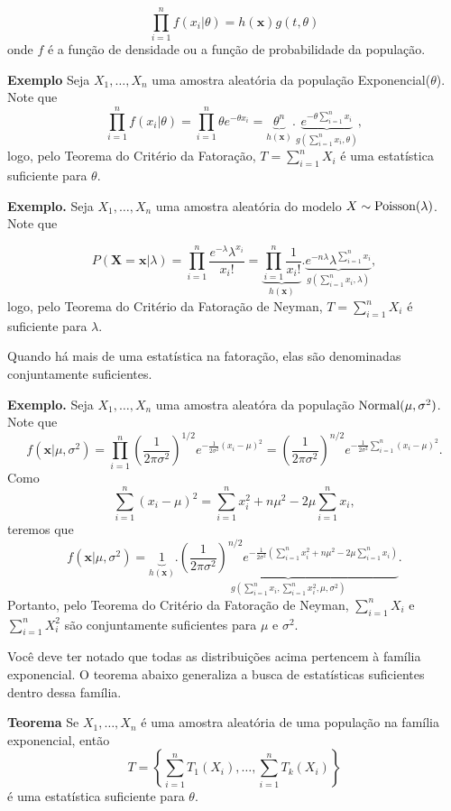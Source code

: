 \documentclass[
  letterpaper,
  DIV=11,
  numbers=noendperiod]{scrreprt}
\begin{document}
\[\prod_{i=1}^nf(x_i|\theta)=h(\textbf{x})g(t,\theta)\] onde \(f\) é a
função de densidade ou a função de probabilidade da população.

\textbf{Exemplo} Seja \(X_1,\ldots,X_n\) uma amostra aleatória da
população Exponencial(\(\theta\)). Note que
\[\prod_{i=1}^n  f(x_i|\theta)=\prod_{i=1}^n \theta e^{-\theta x_i}=\underbrace{\theta^n}_{h(\textbf{x})}. \underbrace{e^{-\theta\sum_{i=1}^n x_i}}_{g(\sum_{i=1}^n x_i,\theta)},\]
logo, pelo Teorema do Critério da Fatoração, \(T=\sum_{i=1}^{n}X_i\) é
uma estatística suficiente para \(\theta\).

\textbf{Exemplo.} Seja \(X_1,\ldots,X_n\) uma amostra aleatória do
modelo \(X\sim\hbox{Poisson}(\lambda)\). Note que

\[P(\textbf{X}=\textbf{x}|\lambda)=\prod_{i=1}^n\frac{e^{-\lambda}\lambda^{x_i}}{x_i!}=\underbrace{\prod_{i=1}^n\frac{1}{x_i!}}_{h(\textbf{x})}.\underbrace{e^{-n\lambda}\lambda^{\sum_{i=1}^n x_i}}_{g(\sum_{i=1}^n x_i,\lambda)},\]
logo, pelo Teorema do Critério da Fatoração de Neyman,
\(T=\sum_{i=1}^n X_i\) é suficiente para \(\lambda\).

Quando há mais de uma estatística na fatoração, elas são denominadas
conjuntamente suficientes.

\textbf{Exemplo.} Seja \(X_1,\ldots,X_n\) uma amostra aleatóra da
população \(\hbox{Normal}(\mu,\sigma^2)\). Note que
\[f(\textbf{x}|\mu,\sigma^2)=\prod_{i=1}^n\left(\frac{1}{2\pi\sigma^2}\right)^{1/2} e^{-\frac{1}{2\sigma^2}(x_i-\mu)^2}=\left(\frac{1}{2\pi\sigma^2}\right)^{n/2} e^{-\frac{1}{2\sigma^2}\sum_{i=1}^n(x_i-\mu)^2}.\]
Como
\[\sum_{i=1}^n(x_i-\mu)^2=\sum_{i=1}^n x_i^2 +n\mu^2-2\mu\sum_{i=1}^n x_i,\]
teremos que
\[f(\textbf{x}|\mu,\sigma^2)=\underbrace{1}_{h(\textbf{x})}.\underbrace{\left(\frac{1}{2\pi\sigma^2}\right)^{n/2} e^{-\frac{1}{2\sigma^2}\left(\sum_{i=1}^n x_i^2 +n\mu^2-2\mu\sum_{i=1}^n x_i\right)}}_{g( \sum_{i=1}^n x_{i},\sum_{i=1}^n x_i^2,\mu,\sigma^2)}.\]
Portanto, pelo Teorema do Critério da Fatoração de Neyman,
\(\sum_{i=1}^nX_i\) e \(\sum_{i=1}^n X_i^2\) são conjuntamente
suficientes para \(\mu\) e \(\sigma^2\).

Você deve ter notado que todas as distribuições acima pertencem à
família exponencial. O teorema abaixo generaliza a busca de estatísticas
suficientes dentro dessa família.

\textbf{Teorema} Se \(X_1,\ldots,X_n\) é uma amostra aleatória de uma
população na família exponencial, então
\[T=\left\{\sum_{i=1}^n T_1(X_i),\ldots,\sum_{i=1}^n T_k(X_i)\right\}\]
é uma estatística suficiente para \(\theta\).
\end{document}
